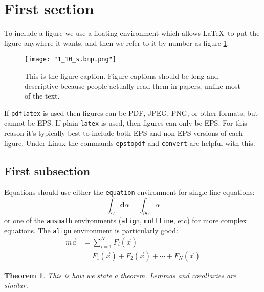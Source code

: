 \documentclass[11pt]{article}
\newtheorem{theorem}{Theorem}[section]
\begin{document}
\section{First section}

To include a figure we use a floating environment which allows
\LaTeX\ to put the figure anywhere it wants, and then we refer to it
by number as figure \ref{fig:sample}.

\begin{figure}
\begin{center}
\texttt{[image: "1\_10\_s.bmp.png"]}
\end{center}
\caption{\label{fig:sample} This is the figure caption. Figure
  captions should be long and descriptive because people actually read
  them in papers, unlike most of the text.}
\end{figure}

If \verb+pdflatex+ is used then figures can be PDF, JPEG, PNG, or
other formats, but cannot be EPS. If plain \verb+latex+ is used, then
figures can only be EPS. For this reason it's typically best to
include both EPS and non-EPS versions of each figure. Under Linux the
commands \verb+epstopdf+ and \verb+convert+ are helpful with this.


\subsection{First subsection}

Equations should use either the \verb+equation+ environment for single
line equations:
\begin{equation}
\label{eqn:stokes_thm}
\int_{\Omega} \mathbf{d}\alpha = \int_{\partial \Omega} \alpha
\end{equation}
or one of the \verb+amsmath+ environments (\verb+align+,
\verb+multline+, etc) for more complex equations. The \verb+align+
environment is particularly good:
\begin{align}
\label{eqn:newton}
m\vec{a} &= \sum_{i = 1}^N F_i(\vec{x}) \\
\label{eqn:newton_expanded}
&= F_1(\vec{x}) + F_2(\vec{x}) + \cdots + F_N(\vec{x})
\end{align}

\begin{theorem}
\label{thm:big_result}
This is how we state a theorem. Lemmas and corollaries are similar.
\end{theorem}
\end{document}
